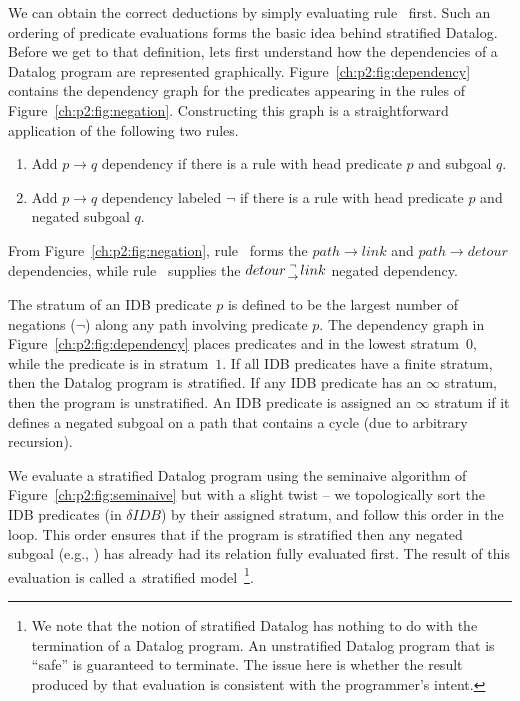 We can obtain the correct deductions by simply evaluating rule~ first.
Such an ordering of predicate evaluations forms the basic idea behind
stratified Datalog.  Before we get to that definition, lets first understand
how the dependencies of a Datalog program are represented graphically.
Figure~\ref{ch:p2:fig:dependency} contains the dependency graph for the predicates
appearing in the rules of Figure~\ref{ch:p2:fig:negation}. Constructing this graph
is a straightforward application of the following two rules.
\begin{enumerate}
  \ssp
  \item Add $p \rightarrow q$ dependency if there is a rule with head predicate $p$ and subgoal $q$.
  \item Add $p \rightarrow q$ dependency labeled $\neg$ if there is a rule with head predicate $p$ and negated subgoal $q$.
\end{enumerate}
From Figure~\ref{ch:p2:fig:negation}, rule~ forms the $path \rightarrow
link$ and $path \rightarrow detour$ dependencies, while rule~ supplies the
$detour {\neg \atop \rightarrow} link$ negated dependency. 

The stratum of an IDB predicate $p$ is defined to be the largest number of
negations ($\neg$) along any path involving predicate $p$.  The dependency graph
in Figure~\ref{ch:p2:fig:dependency} places predicates  and
 in the lowest stratum~$0$, while the  predicate is in
stratum~$1$.  If all IDB predicates have a finite stratum, then the Datalog
program is {\emph stratified}.  If any IDB predicate has an $\infty$ stratum,
then the program is unstratified.  An IDB predicate is assigned an $\infty$
stratum if it defines a negated subgoal on a path that contains a cycle (due
to arbitrary recursion).

We evaluate a stratified Datalog program using the seminaive algorithm of
Figure~\ref{ch:p2:fig:seminaive} but with a slight twist -- we topologically
sort the IDB predicates (in $\delta IDB$) by their assigned stratum, and follow
this order in the loop.  This order ensures that if the program is stratified
then any negated subgoal (e.g., ) has already had its relation fully
evaluated first.  The result of this evaluation is called a {\emph stratified
model}~\footnote{We note that the notion of stratified Datalog has nothing to
do with the termination of a Datalog program.  An unstratified Datalog program
that is ``safe'' is guaranteed to terminate.  The issue here is whether the
result produced by that evaluation is consistent with the programmer's
intent.}.

